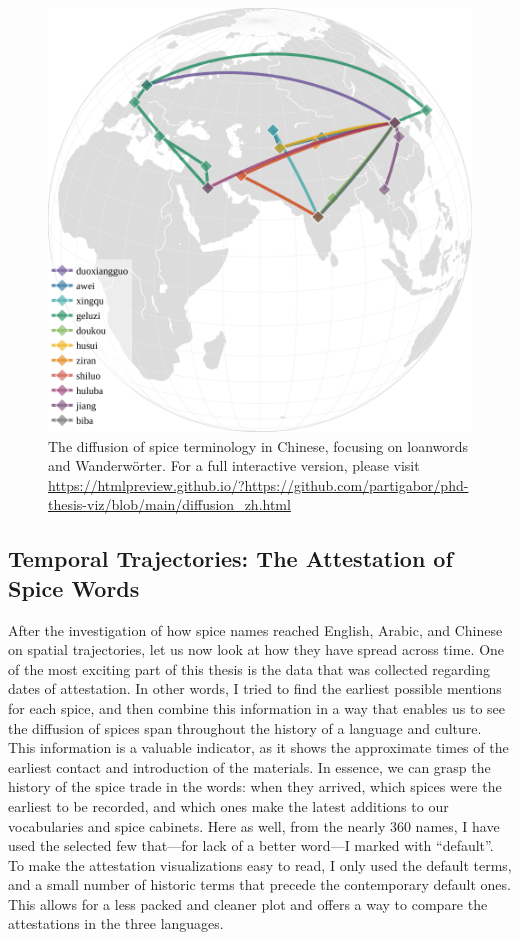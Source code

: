 \begin{figure}[ht!]
    \includegraphics[width=\linewidth]{imgs/plots/diffusion_zh.pdf}
    \caption[The diffusion of spice terminology in Chinese.]{The diffusion of spice terminology in Chinese, focusing on loanwords and Wanderwörter. For a full interactive version, please visit \url{https://htmlpreview.github.io/?https://github.com/partigabor/phd-thesis-viz/blob/main/diffusion_zh.html}}
    \label{fig:diffusion_zh}
\end{figure}

\subsection{Temporal Trajectories: The Attestation of Spice Words}

After the investigation of how spice names reached English, Arabic, and Chinese on spatial trajectories, let us now look at how they have spread across time. One of the most exciting part of this thesis is the data that was collected regarding dates of attestation. In other words, I tried to find the earliest possible mentions for each spice, and then combine this information in a way that enables us to see the diffusion of spices span throughout the history of a language and culture. This information is a valuable indicator, as it shows the approximate times of the earliest contact and introduction of the materials. In essence, we can grasp the history of the spice trade in the words: when they arrived, which spices were the earliest to be recorded, and which ones make the latest additions to our vocabularies and spice cabinets. Here as well, from the nearly 360 names, I have used the selected few that---for lack of a better word---I marked with ``default''. To make the attestation visualizations easy to read, I only used the default terms, and a small number of historic terms that precede the contemporary default ones. This allows for a less packed and cleaner plot and offers a way to compare the attestations in the three languages. 

